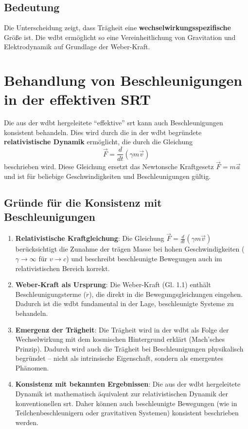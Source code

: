 \subsection{Bedeutung}
Die Unterscheidung zeigt, dass Trägheit eine \textbf{wechselwirkungsspezifische} Größe ist. Die \gls{wdbt} ermöglicht so eine Vereinheitlichung von Gravitation und Elektrodynamik auf Grundlage der
Weber-Kraft.

\section{Behandlung von Beschleunigungen in der effektiven SRT}

Die aus der \gls{wdbt} hergeleitete \enquote{effektive} \gls{srt} kann auch Beschleunigungen konsistent behandeln. Dies wird durch die in der \gls{wdbt} begründete \textbf{relativistische Dynamik} ermöglicht,
die durch die Gleichung
\[
\vec{F} = \frac{d}{dt}(\gamma m \vec{v})
\]
beschrieben wird. Diese Gleichung ersetzt das Newtonsche Kraftgesetz $\vec{F} = m \vec{a}$ und ist für beliebige Geschwindigkeiten und Beschleunigungen gültig.

\subsection{Gründe für die Konsistenz mit Beschleunigungen}

\begin{enumerate}
    \item \textbf{Relativistische Kraftgleichung}: Die Gleichung $\vec{F} = \frac{d}{dt}(\gamma m \vec{v})$ berücksichtigt die Zunahme der trägen Masse bei hohen Geschwindigkeiten ($\gamma \to \infty$ für $v \to c$) und beschreibt beschleunigte Bewegungen auch im relativistischen Bereich korrekt.
    \item \textbf{Weber-Kraft als Ursprung}: Die Weber-Kraft (Gl. 1.1) enthält Beschleunigungsterme ($\ddot{r}$), die direkt in die Bewegungsgleichungen eingehen. Dadurch ist die \gls{wdbt} fundamental in der Lage, beschleunigte Systeme zu behandeln.
    \item \textbf{Emergenz der Trägheit}: Die Trägheit wird in der \gls{wdbt} als Folge der Wechselwirkung mit dem kosmischen Hintergrund erklärt (Mach'sches Prinzip). Dadurch wird auch die Trägheit bei Beschleunigungen physikalisch begründet -- nicht als intrinsische Eigenschaft, sondern als emergentes Phänomen.    
    \item \textbf{Konsistenz mit bekannten Ergebnissen}: Die aus der \gls{wdbt} hergeleitete Dynamik ist mathematisch äquivalent zur relativistischen Dynamik der konventionellen \gls{srt}. Daher können auch beschleunigte Bewegungen (wie in Teilchenbeschleunigern oder gravitativen Systemen) konsistent beschrieben werden.
\end{enumerate}

